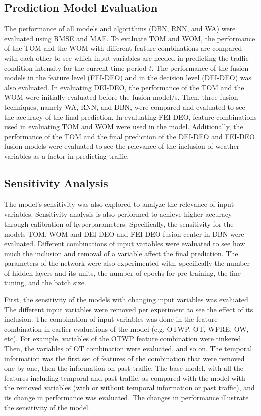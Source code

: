 \subsection{Prediction Model Evaluation}
The performance of all models and algorithms (DBN, RNN, and WA) were evaluated using RMSE and MAE. To evaluate TOM and WOM, the performance of the TOM and the WOM with different feature combinations are compared with each other to see which input variables are needed in predicting the traffic condition intensity for the current time period $t$. The performance of the fusion models in the feature level (FEI-DEO) and in the decision level (DEI-DEO) was also evaluated. In evaluating DEI-DEO, the performance of the TOM and the WOM were initially evaluated before the fusion model/s. Then, three fusion techniques, namely WA, RNN, and DBN, were compared and evaluated to see the accuracy of the final prediction. In evaluating FEI-DEO, feature combinations used in evaluating TOM and WOM were used in the model. Additionally, the performance of the TOM and the final prediction of the DEI-DEO and FEI-DEO fusion models were evaluated to see the relevance of the inclusion of weather variables as a factor in predicting traffic.

\subsection{Sensitivity Analysis}
The model’s sensitivity was also explored to analyze the relevance of input variables. Sensitivity analysis is also performed to achieve higher accuracy through calibration of hyperparameters. Specifically, the sensitivity for the models TOM, WOM and DEI-DEO and FEI-DEO fusion center in DBN were evaluated. Different combinations of input variables were evaluated to see how much the inclusion and removal of a variable affect the final prediction. The parameters of the network were also experimented with, specifically the number of hidden layers and its units, the number of epochs for pre-training, the fine-tuning, and the batch size.

First, the sensitivity of the models with changing input variables was evaluated. The different input variables were removed per experiment to see the effect of its inclusion. The combination of input variables was done in the feature combination in earlier evaluations of the model (e.g. OTWP, OT, WPRE, OW, etc). For example, variables of the OTWP feature combination were tinkered. Then, the variables of OT combination were evaluated, and so on. The temporal information was the first set of features of the combination that were removed one-by-one, then the information on past traffic. The base model, with all the features including temporal and past traffic, as compared with the model with the removed variables (with or without temporal information or past traffic), and its change in performance was evaluated. The changes in performance illustrate the sensitivity of the model. 


